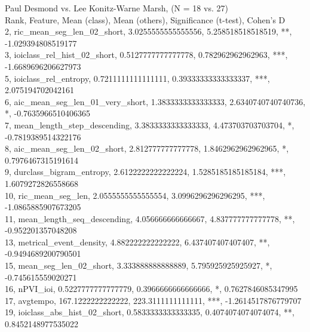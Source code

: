 Paul Desmond vs. Lee Konitz-Warne Marsh, (N = 18 vs. 27)\\
Rank, Feature, Mean (class), Mean (others), Significance (t-test), Cohen's D\\
2, ric_mean_seg_len_02_short, 3.0255555555555556, 5.258518518518519, **, -1.029394808519177\\
3, ioiclass_rel_hist_02_short, 0.5127777777777778, 0.782962962962963, ***, -1.6689696206627973\\
5, ioiclass_rel_entropy, 0.7211111111111111, 0.39333333333333337, ***, 2.075194702042161\\
6, aic_mean_seg_len_01_very_short, 1.3833333333333333, 2.6340740740740736, *, -0.7635966510406365\\
7, mean_length_step_descending, 3.3833333333333333, 4.473703703703704, *, -0.7819389514322176\\
8, aic_mean_seg_len_02_short, 2.812777777777778, 1.8462962962962965, *, 0.7976467315191614\\
9, durclass_bigram_entropy, 2.6122222222222224, 1.5285185185185184, ***, 1.6079272826558668\\
10, ric_mean_seg_len, 2.0555555555555554, 3.0996296296296295, ***, -1.0865885907673205\\
11, mean_length_seq_descending, 4.056666666666667, 4.837777777777778, **, -0.952201357048208\\
13, metrical_event_density, 4.882222222222222, 6.437407407407407, **, -0.9494689200790501\\
15, mean_seg_len_02_short, 3.333888888888889, 5.795925925925927, *, -0.745615559020271\\
16, nPVI_ioi, 0.5227777777777779, 0.3966666666666666, *, 0.7627846085347995\\
17, avgtempo, 167.1222222222222, 223.3111111111111, ***, -1.2614517876779707\\
19, ioiclass_abs_hist_02_short, 0.5833333333333335, 0.4074074074074074, **, 0.8452148977535022\\
